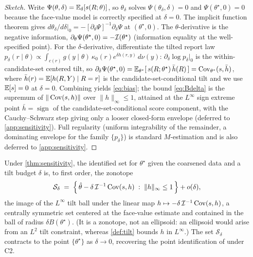 \begin{proof}[Sketch]
Write $\Psi(\theta, \delta) = \mathbb{E}_\delta[s(R; \theta)]$, so $\theta_\delta$ solves
$\Psi(\theta_\delta, \delta) = 0$ and $\Psi(\theta^\star, 0) = 0$ because the
face-value model is correctly specified at $\delta = 0$. The implicit function
theorem gives $d\theta_\delta/d\delta|_0 = -[\partial_\theta \Psi]^{-1}
\partial_\delta \Psi$ at $(\theta^\star, 0)$. The $\theta$-derivative is the
negative information, $\partial_\theta \Psi(\theta^\star, 0) = -\mathcal{I}(\theta^\star)$
(information equality at the well-specified point). For the $\delta$-derivative,
differentiate the tilted report law $p_\delta(r \mid \theta) \propto \int_{c(r)}
g(y \mid \theta)\, \kappa_0(r) e^{\delta h(r,y)}\, d\nu(y)$: $\partial_\delta \log
p_\delta|_0$ is the within-candidate-set centered tilt, so $\partial_\delta
\Psi(\theta^\star, 0) = \mathbb{E}_{\theta^\star}[\, s(R; \theta^\star)\, \bar h(R)\,] =
\operatorname{Cov}_{\theta^\star}(s, \bar h)$, where $\bar h(r) = \mathbb{E}[h(R,Y) \mid R = r]$ is the
candidate-set-conditional tilt and we use $\mathbb{E}[s] = 0$ at $\delta = 0$. Combining
yields \eqref{eq:bias}; the bound \eqref{eq:Bdelta} is the supremum of
$\|\operatorname{Cov}(s, h)\|$ over $\|h\|_\infty \le 1$, attained at the $L^\infty$ sign extreme
point $\bar h = \operatorname{sign}$ of the candidate-set-conditional score
component, with the Cauchy--Schwarz step giving only a looser closed-form envelope
(deferred to \cref{app:sensitivity}). Full regularity (uniform integrability of the
remainder, a dominating envelope for the family $\{p_\delta\}$) is standard
$M$-estimation and is also deferred to \cref{app:sensitivity}.
\end{proof}

\begin{corollary}
\label{cor:partial}
Under \cref{thm:sensitivity}, the identified set for $\theta^\star$ given the
coarsened data and a tilt budget $\delta$ is, to first order, the zonotope
\begin{equation}
  \mathcal{S}_\delta
  \;=\; \Big\{\, \hat\theta - \delta\, \mathcal{I}^{-1}\operatorname{Cov}(s, h)
        \;:\; \|h\|_\infty \le 1 \,\Big\} + o(\delta),
  \label{eq:identset}
\end{equation}
the image of the $L^\infty$ tilt ball under the linear map $h \mapsto -\delta\,
\mathcal{I}^{-1}\operatorname{Cov}(s, h)$, a centrally symmetric set centered at the face-value estimate
and contained in the ball of radius $\delta B(\theta^\star)$. (It is a zonotope, not
an ellipsoid: an ellipsoid would arise from an $L^2$ tilt constraint, whereas
\cref{def:tilt} bounds $h$ in $L^\infty$.) The set $\mathcal{S}_\delta$ contracts to
the point $\{\theta^\star\}$ as $\delta \to 0$, recovering the point identification
of \citet{towell2026synthesis} under C2.
\end{corollary}

